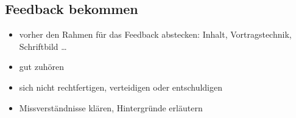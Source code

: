 \subsection{Feedback bekommen}
\begin{itemize}
  \item vorher den Rahmen für das Feedback abstecken: Inhalt, Vortragstechnik, Schriftbild \ldots
  \item  gut zuhören
  \item sich nicht rechtfertigen, verteidigen oder entschuldigen
  \item Missverständnisse klären, Hintergründe erläutern
\end{itemize}
